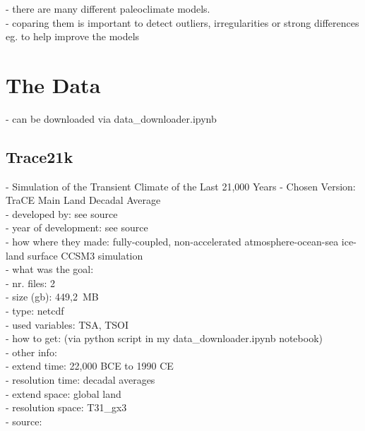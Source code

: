 \documentclass[12pt]{scrartcl}
\begin{document}
- there are many different paleoclimate models.\\
- coparing them is important to detect outliers, irregularities or strong differences eg. to help improve the models\\


\section{The Data}
- can be downloaded via data\_downloader.ipynb

\subsection{Trace21k}
- Simulation of the Transient Climate of the Last 21,000 Years
- Chosen Version: TraCE Main Land Decadal Average\\
- developed by: see source \\
- year of development: see source\\
- how where they made: fully-coupled, non-accelerated atmosphere-ocean-sea ice-land surface CCSM3 simulation\\
- what was the goal: \\
- nr. files: 2\\
- size (gb): 449,2 MB\\
- type: netcdf\\
- used variables: TSA, TSOI\\
- how to get: (via python script in my data\_downloader.ipynb notebook)\\
- other info:  \\
- extend time: 22,000 BCE to 1990 CE \\
- resolution time: decadal averages\\
- extend space: global land\\
- resolution space: T31\_gx3\\
- source: \cite{trace21k_data}\\
\end{document}
